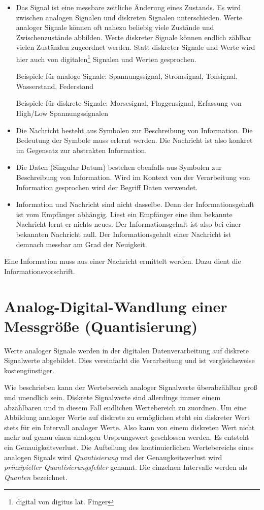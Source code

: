 \begin{itemize}
\item{}
Das Signal ist eine messbare zeitliche Änderung eines Zustands. Es wird zwischen analogen Signalen und diskreten Signalen unterschieden. Werte analoger Signale können oft nahezu beliebig viele Zustände und Zwischenzustände abbilden. Werte diskreter Signale können endlich zählbar vielen Zuständen zugeordnet werden. Statt diskreter Signale und Werte wird hier auch von digitalen\footnote{digital von digitus lat. Finger} Signalen und Werten gesprochen.

Beispiele für analoge Signale: Spannungssignal, Stromsignal, Tonsignal, Wasserstand, Federstand

Beispiele für diskrete Signale: Morsesignal, Flaggensignal, Erfassung von High/Low Spannungssignalen

\item{}
Die Nachricht besteht aus Symbolen zur Beschreibung von Information. Die Bedeutung der Symbole muss erlernt werden. Die Nachricht ist also konkret im Gegensatz zur abstrakten Information.

\item{}
Die Daten {\small(Singular Datum)} bestehen ebenfalls aus Symbolen zur Beschreibung von Information. Wird im Kontext von der Verarbeitung von Information gesprochen wird der Begriff Daten verwendet.

\item{}
Information und Nachricht sind nicht dasselbe. Denn der Informationsgehalt ist vom Empfänger abhängig. Liest ein Empfänger eine ihm bekannte Nachricht lernt er nichts neues. Der Informationsgehalt ist also bei einer bekannten Nachricht null. Der Informationsgehalt einer Nachricht ist demnach messbar am Grad der Neuigkeit.
\end{itemize}

Eine Information muss aus einer Nachricht ermittelt werden. Dazu dient die Informationsvorschrift.

\section{Analog-Digital-Wandlung einer Messgröße (Quantisierung)}
Werte analoger Signale werden in der digitalen Datenverarbeitung auf diskrete Signalwerte abgebildet. Dies vereinfacht die Verarbeitung und ist vergleichsweise kostengünstiger. 

Wie beschrieben kann der Wertebereich analoger Signalwerte überabzählbar groß und unendlich sein. Diskrete Signalwerte sind allerdings immer einem abzählbaren und in diesem Fall endlichen Wertebereich zu zuordnen. Um eine Abbildung analoger Werte auf diskrete zu ermöglichen steht ein diskreter Wert stets für ein Intervall analoger Werte. Also kann von einem diskreten Wert nicht mehr auf genau einen analogen Ursprungswert geschlossen werden. Es entsteht ein Genauigkeitsverlust. Die Aufteilung des kontinuierlichen Wertebereichs eines analogen Signals wird \textsl{Quantisierung} und der Genaugkeitsverlust wird \textsl{prinzipieller Quantisierungsfehler} genannt. Die einzelnen Intervalle werden als \textsl{Quanten} bezeichnet. 

